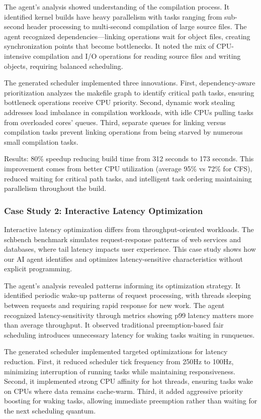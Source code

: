 The agent's analysis showed understanding of the compilation process. It identified kernel builds have heavy parallelism with tasks ranging from sub-second header processing to multi-second compilation of large source files. The agent recognized dependencies—linking operations wait for object files, creating synchronization points that become bottlenecks. It noted the mix of CPU-intensive compilation and I/O operations for reading source files and writing objects, requiring balanced scheduling.

The generated scheduler implemented three innovations. First, dependency-aware prioritization analyzes the makefile graph to identify critical path tasks, ensuring bottleneck operations receive CPU priority. Second, dynamic work stealing addresses load imbalance in compilation workloads, with idle CPUs pulling tasks from overloaded cores' queues. Third, separate queues for linking versus compilation tasks prevent linking operations from being starved by numerous small compilation tasks.

Results: 80\% speedup reducing build time from 312 seconds to 173 seconds. This improvement comes from better CPU utilization (average 95\% vs 72\% for CFS), reduced waiting for critical path tasks, and intelligent task ordering maintaining parallelism throughout the build.

\subsubsection{Case Study 2: Interactive Latency Optimization}

Interactive latency optimization differs from throughput-oriented workloads. The schbench benchmark simulates request-response patterns of web services and databases, where tail latency impacts user experience. This case study shows how our AI agent identifies and optimizes latency-sensitive characteristics without explicit programming.

The agent's analysis revealed patterns informing its optimization strategy. It identified periodic wake-up patterns of request processing, with threads sleeping between requests and requiring rapid response for new work. The agent recognized latency-sensitivity through metrics showing p99 latency matters more than average throughput. It observed traditional preemption-based fair scheduling introduces unnecessary latency for waking tasks waiting in runqueues.

The generated scheduler implemented targeted optimizations for latency reduction. First, it reduced scheduler tick frequency from 250Hz to 100Hz, minimizing interruption of running tasks while maintaining responsiveness. Second, it implemented strong CPU affinity for hot threads, ensuring tasks wake on CPUs where data remains cache-warm. Third, it added aggressive priority boosting for waking tasks, allowing immediate preemption rather than waiting for the next scheduling quantum.

